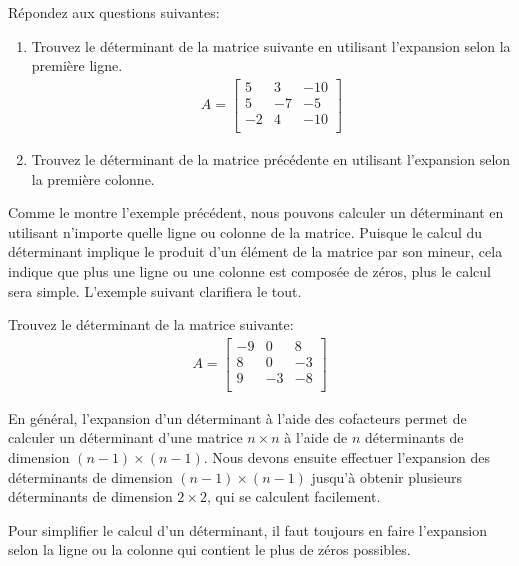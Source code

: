 \documentclass[]{book}
\providecommand{\tightlist}{%
  \setlength{\itemsep}{0pt}\setlength{\parskip}{0pt}}
\theoremstyle{definition}
\theoremstyle{definition}
\theoremstyle{definition}
\theoremstyle{remark}
\let\BeginKnitrBlock\begin \let\EndKnitrBlock\end
\begin{document}
\BeginKnitrBlock{example}
\protect\hypertarget{exm:unnamed-chunk-93}{}{\label{exm:unnamed-chunk-93} }Répondez aux questions suivantes:

\begin{enumerate}
\def\labelenumi{\alph{enumi}.}
\tightlist
\item
  Trouvez le déterminant de la matrice suivante en utilisant l'expansion selon la première ligne.
  \begin{align*}
  A=\begin{bmatrix}
  5&3&-10\\
  5&-7&-5\\
  -2&4&-10\\
  \end{bmatrix}
  \end{align*}
\item
  Trouvez le déterminant de la matrice précédente en utilisant l'expansion selon la première colonne.
\end{enumerate}
\EndKnitrBlock{example}

Comme le montre l'exemple précédent, nous pouvons calculer un déterminant en utilisant n'importe quelle ligne ou colonne de la matrice. Puisque le calcul du déterminant implique le produit d'un élément de la matrice par son mineur, cela indique que plus une ligne ou une colonne est composée de zéros, plus le calcul sera simple. L'exemple suivant clarifiera le tout.

\BeginKnitrBlock{example}
\protect\hypertarget{exm:unnamed-chunk-94}{}{\label{exm:unnamed-chunk-94} }Trouvez le déterminant de la matrice suivante:
\begin{align*}
A = \begin{bmatrix}
-9&0&8\\
8&0&-3\\
9&-3&-8\\
\end{bmatrix}
\end{align*}
\EndKnitrBlock{example}

En général, l'expansion d'un déterminant à l'aide des cofacteurs permet de calculer un déterminant d'une matrice \(n\times n\) à l'aide de \(n\) déterminants de dimension \((n-1)\times (n-1)\). Nous devons ensuite effectuer l'expansion des déterminants de dimension \((n-1)\times (n-1)\) jusqu'à obtenir plusieurs déterminants de dimension \(2\times 2\), qui se calculent facilement.

\BeginKnitrBlock{remark}
{}Pour simplifier le calcul d'un déterminant, il faut toujours en faire l'expansion selon la ligne ou la colonne qui contient le plus de zéros possibles.
\EndKnitrBlock{remark}
\end{document}

